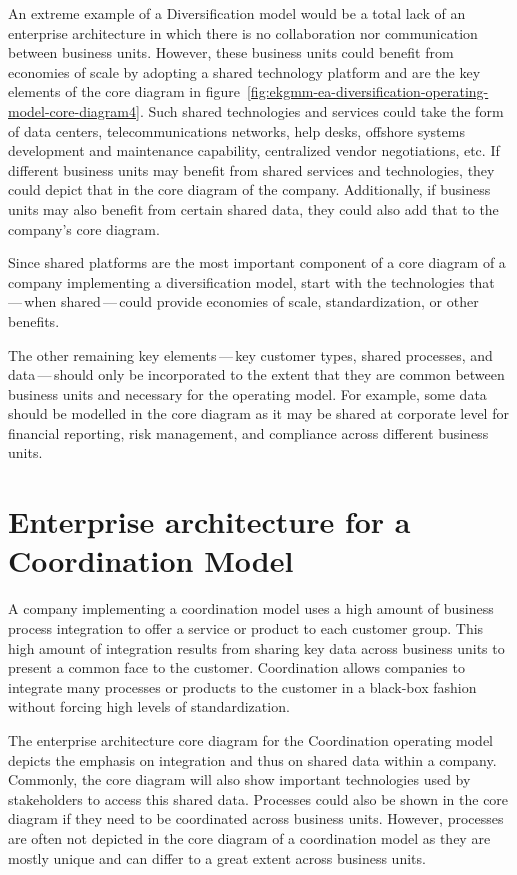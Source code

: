 An extreme example of a Diversification model would be a total lack of an enterprise architecture in which there is
no collaboration nor communication between business units.
However, these business units could benefit from economies of scale by adopting a shared technology platform and
are the key elements of the core diagram in figure~\ref{fig:ekgmm-ea-diversification-operating-model-core-diagram4}.
Such shared technologies and services could take the form of data centers, telecommunications networks,
help desks, offshore systems development and maintenance capability, centralized vendor negotiations, etc.
If different business units may benefit from shared services and technologies, they could depict that in the
core diagram of the company.\newline
Additionally, if business units may also benefit from certain shared data, they could also add that to the company's
core diagram.

Since shared platforms are the most important component of a core diagram of a company implementing a
diversification model, start with the technologies that\,---\,when shared\,---\,could provide economies of scale,
standardization, or other benefits.

The other remaining key elements\,---\,key customer types, shared processes, and data\,---\,should only be incorporated
to the extent that they are common between business units and necessary for the operating model.
For example, some data should be modelled in the core diagram as it may be shared at corporate level for
financial reporting, risk management, and compliance across different business units.

\section*{Enterprise architecture for a Coordination Model}

A company implementing a coordination model uses a high amount of business process integration to offer a service
or product to each customer group.
This high amount of integration results from sharing key data across business units to present a common face to
the customer.
Coordination allows companies to integrate many processes or products to the customer in a black-box fashion without
forcing high levels of standardization.

The enterprise architecture core diagram for the Coordination operating model depicts the emphasis on integration
and thus on shared data within a company.
Commonly, the core diagram will also show important technologies used by stakeholders to access this shared data.
Processes could also be shown in the core diagram if they need to be coordinated across business units.
However, processes are often not depicted in the core diagram of a coordination model as they are mostly unique
and can differ to a great extent across business units.

